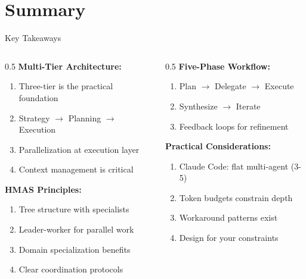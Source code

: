 \documentclass[aspectratio=169,11pt]{beamer}
\begin{document}
\section{Summary}

\begin{frame}{Key Takeaways}
    \begin{columns}[T]
        \begin{column}{0.5\textwidth}
            \textbf{Multi-Tier Architecture:}
            \begin{enumerate}
                \item Three-tier is the practical foundation
                \item Strategy $\rightarrow$ Planning $\rightarrow$ Execution
                \item Parallelization at execution layer
                \item Context management is critical
            \end{enumerate}

            \vspace{0.3cm}
            \textbf{HMAS Principles:}
            \begin{enumerate}
                \item Tree structure with specialists
                \item Leader-worker for parallel work
                \item Domain specialization benefits
                \item Clear coordination protocols
            \end{enumerate}
        \end{column}
        \begin{column}{0.5\textwidth}
            \textbf{Five-Phase Workflow:}
            \begin{enumerate}
                \item Plan $\rightarrow$ Delegate $\rightarrow$ Execute
                \item Synthesize $\rightarrow$ Iterate
                \item Feedback loops for refinement
            \end{enumerate}

            \vspace{0.3cm}
            \textbf{Practical Considerations:}
            \begin{enumerate}
                \item Claude Code: flat multi-agent (3-5)
                \item Token budgets constrain depth
                \item Workaround patterns exist
                \item Design for your constraints
            \end{enumerate}
        \end{column}
    \end{columns}


\end{frame}
\end{document}
